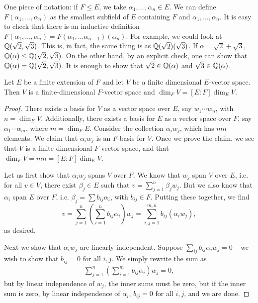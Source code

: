 \documentclass{../mathnotes}
\begin{document}
One piece of notation: if $F\leq E$, we take $\alpha_1,\ldots, \alpha_n\in E$. We can define $F(\alpha_1,\ldots,\alpha_n)$
as the smallest subfield of $E$ containing $F$ and $\alpha_1,\ldots,\alpha_n$. It is easy to check that there is an inductive
definition $F(\alpha_1,\ldots, \alpha_n)=F(\alpha_1,\ldots \alpha_{n-1})(\alpha_n)$. For example, we could look at $\mathbb{Q}(\sqrt{2},\sqrt{3})$.
This is, in fact, the same thing is as $\mathbb{Q}(\sqrt{2})(\sqrt{3})$. If $\alpha=\sqrt{2}+\sqrt{3}$, $\mathbb{Q}(\alpha)\leq \mathbb{Q}(\sqrt{2},\sqrt{3})$.
On the other hand, by an explicit check, one can show that $\mathbb{Q}(\alpha)=\mathbb{Q}(\sqrt{2},\sqrt{3})$. It is enough to show that
$\sqrt{2}\in\mathbb{Q}(\alpha)$ and $\sqrt{3}\in\mathbb{Q}(\alpha)$.

\begin{lem}
    Let $E$ be a finite extension of $F$ and let $V$ be a finite dimensional $E$-vector space. Then $V$ is a finite-dimensional $F$-vector space
    and $\dim_F V=[E:F]\dim_E V$.
\end{lem}
\begin{proof}
    There exists a basis for $V$ as a vector space over $E$, say $w_1\cdots w_n$, with $n=\dim_E V$. Additionally, there exists
    a basis for $E$ as a vector space over $F$, say $\alpha_1\cdots\alpha_m$, where $m=\dim_F E$. Consider the collection
    $\alpha_i w_j$, which has $mn$ elements. We claim that $\alpha_i w_j$ is an $F$-basis for $V$. Once we prove the claim, we see
    that $V$ is a finite-dimensional $F$-vector space, and that $\dim_F V=mn=[E:F]\dim_E V$.

    Let us first show that $\alpha_i w_j$ spans $V$ over $F$. We know that $w_j$ span $V$ over $E$, i.e. for all $v\in V$,
    there exist $\beta_j\in E$ such that $v=\sum_{j=1}^n\beta_j w_j$. But we also know that $\alpha_i$ span $E$ over $F$, i.e.
    $\beta_j=\sum b_{ij}\alpha_i$, with $b_{ij}\in F$. Putting these together, we find 
    \[v=\sum_{j=1}^n\left( \sum_{i=1}^n b_{ij} \alpha_i \right)w_j=\sum_{i,j=1}^{m,n}b_{ij}(\alpha_iw_j),\]
    as desired.

    Next we show that $\alpha_i w_j$ are linearly independent. Suppose $\sum_{ij}b_{ij}\alpha_iw_j=0$ -- we wish to show that
    $b_{ij}=0$ for all $i,j$. We simply rewrite the sum as
    \begin{align*}
        \sum_{j=1}^n\left( \sum_{i=1}^mb_{ij}\alpha_i \right)w_j=0,
    \end{align*}
    but by linear independence of $w_j$, the inner sums must be zero, but if the inner sum is zero, by linear independence of
    $\alpha_i$, $b_{ij}=0$ for all $i,j$, and we are done.
\end{proof}
\end{document}
